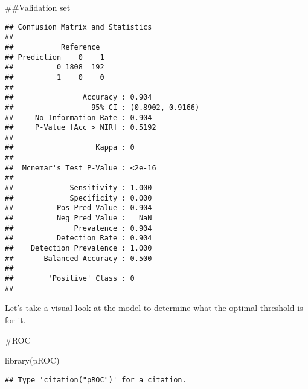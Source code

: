 \documentclass[
]{article}
\newenvironment{Shaded}{\begin{snugshade}}{\end{snugshade}}
\newcommand{\AttributeTok}[1]{\textcolor[rgb]{0.77,0.63,0.00}{#1}}
\newcommand{\FunctionTok}[1]{\textcolor[rgb]{0.00,0.00,0.00}{#1}}
\newcommand{\NormalTok}[1]{#1}
\newcommand{\OtherTok}[1]{\textcolor[rgb]{0.56,0.35,0.01}{#1}}
\newcommand{\SpecialCharTok}[1]{\textcolor[rgb]{0.00,0.00,0.00}{#1}}
\newcommand{\StringTok}[1]{\textcolor[rgb]{0.31,0.60,0.02}{#1}}
\begin{document}
\#\#Validation set

\begin{Shaded}
\end{Shaded}

\begin{verbatim}
## Confusion Matrix and Statistics
## 
##           Reference
## Prediction    0    1
##          0 1808  192
##          1    0    0
##                                           
##                Accuracy : 0.904           
##                  95% CI : (0.8902, 0.9166)
##     No Information Rate : 0.904           
##     P-Value [Acc > NIR] : 0.5192          
##                                           
##                   Kappa : 0               
##                                           
##  Mcnemar's Test P-Value : <2e-16          
##                                           
##             Sensitivity : 1.000           
##             Specificity : 0.000           
##          Pos Pred Value : 0.904           
##          Neg Pred Value :   NaN           
##              Prevalence : 0.904           
##          Detection Rate : 0.904           
##    Detection Prevalence : 1.000           
##       Balanced Accuracy : 0.500           
##                                           
##        'Positive' Class : 0               
## 
\end{verbatim}

Let's take a visual look at the model to determine what the optimal
threshold is for it.

\#ROC

\begin{Shaded}
\begin{Highlighting}[]
\FunctionTok{library}\NormalTok{(pROC)}
\end{Highlighting}
\end{Shaded}

\begin{verbatim}
## Type 'citation("pROC")' for a citation.
\end{verbatim}
\end{document}
